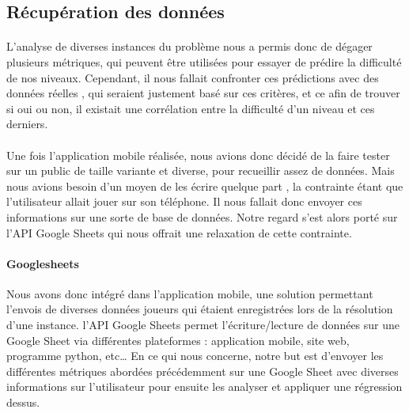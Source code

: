 \documentclass[../main.tex]{subfiles}
\begin{document}
	\subsection{Récupération des données}
	
	\paragraph{}
	L’analyse de diverses instances du problème nous a permis donc de dégager plusieurs métriques, qui peuvent être utilisées pour essayer de prédire la difficulté de nos niveaux. Cependant, il nous fallait confronter ces prédictions avec des données réelles , qui seraient justement basé sur ces critères, et ce afin de trouver si oui ou non, il existait une corrélation entre la difficulté d’un niveau et ces derniers. 
	\paragraph{}
Une fois l’application mobile réalisée, nous avions donc décidé de la faire tester sur un public de taille variante et diverse, pour recueillir assez de données. Mais nous avions besoin d’un moyen de les écrire quelque part , la contrainte étant que l’utilisateur allait jouer sur son téléphone. Il nous fallait donc envoyer ces informations sur une sorte de base de données. Notre regard s’est alors porté sur l’API Google Sheets qui nous offrait une relaxation de cette contrainte.

\paragraph{Googlesheets}
Nous avons donc intégré dans l’application mobile, une solution permettant l’envois de diverses données joueurs qui étaient enregistrées lors de la résolution d’une instance. l’API Google Sheets permet l’écriture/lecture de données sur une Google Sheet via différentes plateformes : application mobile, site web, programme python, etc… 
En ce qui nous concerne, notre but est d’envoyer les différentes métriques abordées précédemment sur une Google Sheet avec diverses informations sur l’utilisateur pour ensuite les analyser et appliquer une régression dessus.
\end{document}
